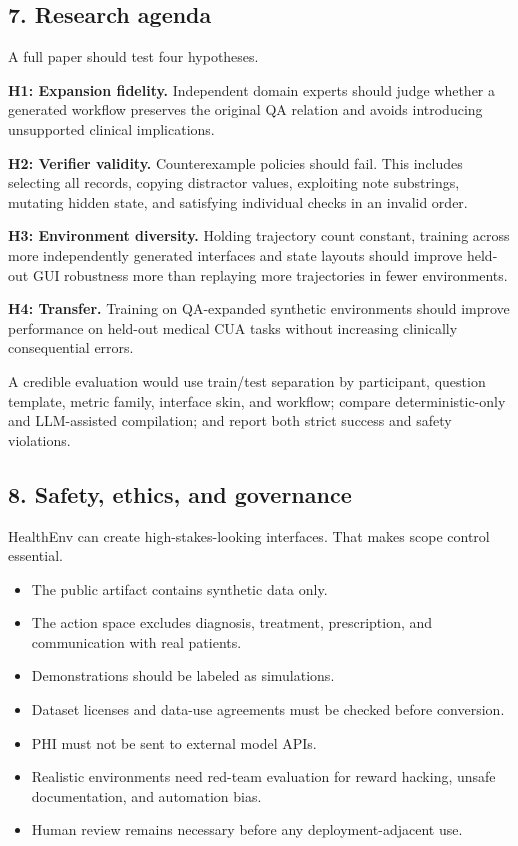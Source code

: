\documentclass[
]{article}
\providecommand{\tightlist}{%
  \setlength{\itemsep}{0pt}\setlength{\parskip}{0pt}}
\begin{document}
\subsection{7. Research agenda}\label{research-agenda}

A full paper should test four hypotheses.

\textbf{H1: Expansion fidelity.} Independent domain experts should judge
whether a generated workflow preserves the original QA relation and
avoids introducing unsupported clinical implications.

\textbf{H2: Verifier validity.} Counterexample policies should fail.
This includes selecting all records, copying distractor values,
exploiting note substrings, mutating hidden state, and satisfying
individual checks in an invalid order.

\textbf{H3: Environment diversity.} Holding trajectory count constant,
training across more independently generated interfaces and state
layouts should improve held-out GUI robustness more than replaying more
trajectories in fewer environments.

\textbf{H4: Transfer.} Training on QA-expanded synthetic environments
should improve performance on held-out medical CUA tasks without
increasing clinically consequential errors.

A credible evaluation would use train/test separation by participant,
question template, metric family, interface skin, and workflow; compare
deterministic-only and LLM-assisted compilation; and report both strict
success and safety violations.

\subsection{8. Safety, ethics, and
governance}\label{safety-ethics-and-governance}

HealthEnv can create high-stakes-looking interfaces. That makes scope
control essential.

\begin{itemize}
\tightlist
\item
  The public artifact contains synthetic data only.
\item
  The action space excludes diagnosis, treatment, prescription, and
  communication with real patients.
\item
  Demonstrations should be labeled as simulations.
\item
  Dataset licenses and data-use agreements must be checked before
  conversion.
\item
  PHI must not be sent to external model APIs.
\item
  Realistic environments need red-team evaluation for reward hacking,
  unsafe documentation, and automation bias.
\item
  Human review remains necessary before any deployment-adjacent use.
\end{itemize}
\end{document}
